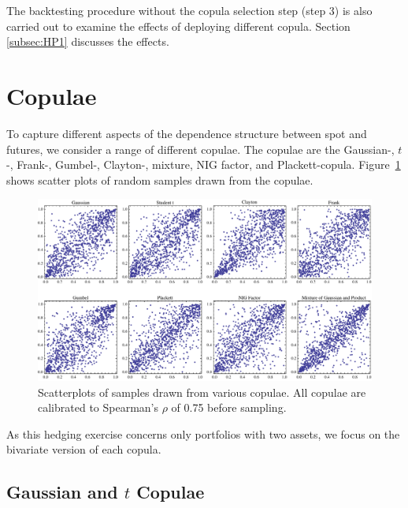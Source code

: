 The backtesting procedure without the copula selection step (step 3) is also carried out to examine the effects of deploying different copula. 
Section \ref{subsec:HP1} discusses the effects. 

\section{Copulae}\label{sec:crm}
To capture different aspects of the dependence structure between spot and futures, we consider
a range of different copulae. 
The copulae are the Gaussian-, $t$-, Frank-,
Gumbel-, Clayton-, mixture, NIG factor, and Plackett-copula. 
Figure~\ref{fig:copulaeScatterPlot} shows scatter plots of random
samples drawn from the copulae. 
\begin{figure}[t]
    \centering
  \includegraphics[width=\textwidth]{_pics/copulas_scatterplots.pdf}
  \caption{Scatterplots of samples drawn from various copulae. All
    copulae are calibrated to Spearman's $\rho$ of 0.75 before
    sampling.}\label{fig:copulaeScatterPlot} 
\end{figure}

As this hedging exercise concerns only portfolios with two assets, we
focus on the bivariate version of each copula. 

\subsection{Gaussian and $t$ Copulae}\label{sec:ellpitical-copulae}

